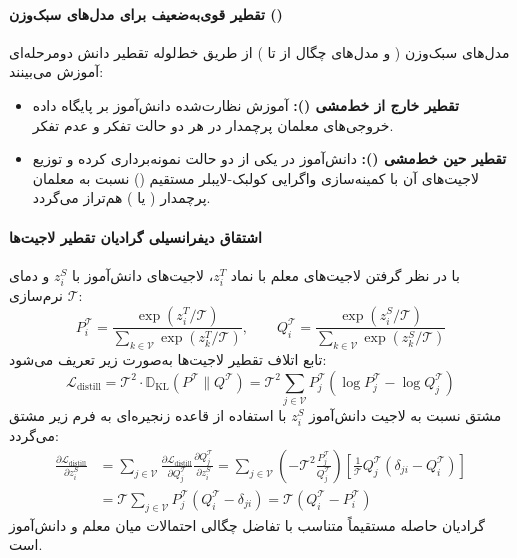 \paragraph*{تقطیر قوی‌به‌ضعیف برای مدل‌های سبک‌وزن ()}
مدل‌های سبک‌وزن ( و مدل‌های چگال از  تا ) از طریق خط‌لوله تقطیر دانش دومرحله‌ای آموزش می‌بینند:
\begin{itemize}
    \item \textbf{تقطیر خارج از خط‌مشی ():} آموزش نظارت‌شده دانش‌آموز بر پایگاه داده خروجی‌های معلمان پرچمدار در هر دو حالت تفکر و عدم تفکر.
    \item \textbf{تقطیر حین خط‌مشی ():} دانش‌آموز در یکی از دو حالت نمونه‌برداری کرده و توزیع لاجیت‌های آن با کمینه‌سازی واگرایی کولبک-لایبلر مستقیم () نسبت به معلمان پرچمدار ( یا ) هم‌تراز می‌گردد.
\end{itemize}

\paragraph*{اشتقاق دیفرانسیلی گرادیان تقطیر لاجیت‌ها}
با در نظر گرفتن لاجیت‌های معلم با نماد $z_i^T$، لاجیت‌های دانش‌آموز با $z_i^S$ و دمای نرم‌سازی $\mathcal{T}$:
\begin{equation}
    P_i^\mathcal{T} = \frac{\exp(z_i^T / \mathcal{T})}{\sum_{k \in \mathcal{V}} \exp(z_k^T / \mathcal{T})}, \qquad Q_i^\mathcal{T} = \frac{\exp(z_i^S / \mathcal{T})}{\sum_{k \in \mathcal{V}} \exp(z_k^S / \mathcal{T})}
\end{equation}
تابع اتلاف تقطیر لاجیت‌ها به‌صورت زیر تعریف می‌شود:
\begin{equation}
    \mathcal{L}_{\text{distill}} = \mathcal{T}^2 \cdot \mathbb{D}_{\text{KL}}(P^\mathcal{T} \parallel Q^\mathcal{T}) = \mathcal{T}^2 \sum_{j \in \mathcal{V}} P_j^\mathcal{T} \left( \log P_j^\mathcal{T} - \log Q_j^\mathcal{T} \right)
\end{equation}
مشتق نسبت به لاجیت دانش‌آموز $z_i^S$ با استفاده از قاعده زنجیره‌ای به فرم زیر مشتق می‌گردد:
\begin{equation}
\begin{aligned}
    \frac{\partial \mathcal{L}_{\text{distill}}}{\partial z_i^S} &= \sum_{j \in \mathcal{V}} \frac{\partial \mathcal{L}_{\text{distill}}}{\partial Q_j^\mathcal{T}} \frac{\partial Q_j^\mathcal{T}}{\partial z_i^S} = \sum_{j \in \mathcal{V}} \left( - \mathcal{T}^2 \frac{P_j^\mathcal{T}}{Q_j^\mathcal{T}} \right) \left[ \frac{1}{\mathcal{T}} Q_j^\mathcal{T} (\delta_{ji} - Q_i^\mathcal{T}) \right] \\
    &= \mathcal{T} \sum_{j \in \mathcal{V}} P_j^\mathcal{T} (Q_i^\mathcal{T} - \delta_{ji}) = \mathcal{T} (Q_i^\mathcal{T} - P_i^\mathcal{T})
\end{aligned}
\end{equation}
گرادیان حاصله مستقیماً متناسب با تفاضل چگالی احتمالات میان معلم و دانش‌آموز است.

